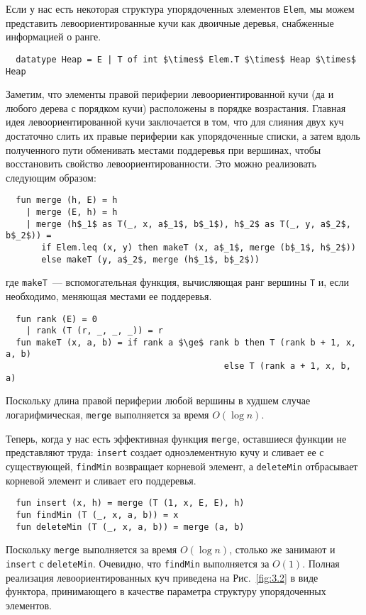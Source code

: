 Если у нас есть некоторая структура упорядоченных элементов
\lstinline!Elem!, мы можем представить левоориентированные кучи как
двоичные деревья, снабженные информацией о ранге.
\begin{lstlisting}
  datatype Heap = E | T of int $\times$ Elem.T $\times$ Heap $\times$ Heap
\end{lstlisting}
Заметим, что элементы правой периферии левоориентированной кучи (да и
любого дерева с порядком кучи) расположены в порядке возрастания.
Главная идея левоориентированной кучи заключается в том, что для
слияния двух куч достаточно слить их правые периферии как
упорядоченные списки, а затем вдоль полученного пути обменивать
местами поддеревья при вершинах, чтобы восстановить свойство
левоориентированности.  Это можно реализовать следующим образом:
\begin{lstlisting}
  fun merge (h, E) = h
    | merge (E, h) = h
    | merge (h$_1$ as T(_, x, a$_1$, b$_1$), h$_2$ as T(_, y, a$_2$, b$_2$)) =
       if Elem.leq (x, y) then makeT (x, a$_1$, merge (b$_1$, h$_2$))
       else makeT (y, a$_2$, merge (h$_1$, b$_2$))
\end{lstlisting}
где \lstinline!makeT!~--- вспомогательная функция, вычисляющая ранг
вершины \lstinline!T! и, если необходимо, меняющая местами ее
поддеревья.
\begin{lstlisting}
  fun rank (E) = 0
    | rank (T (r, _, _, _)) = r
  fun makeT (x, a, b) = if rank a $\ge$ rank b then T (rank b + 1, x, a, b)
                                           else T (rank a + 1, x, b, a)
\end{lstlisting}
Поскольку длина правой периферии любой вершины в худшем случае
логарифмическая, \lstinline!merge! выполняется за время $O(\log n)$.

Теперь, когда у нас есть эффективная функция \lstinline!merge!,
оставшиеся функции не представляют труда: \lstinline!insert! создает
одноэлементную кучу и сливает ее с существующей, \lstinline!findMin!
возвращает корневой элемент, а \lstinline!deleteMin! отбрасывает
корневой элемент и сливает его поддеревья.
\begin{lstlisting}
  fun insert (x, h) = merge (T (1, x, E, E), h)
  fun findMin (T (_, x, a, b)) = x
  fun deleteMin (T (_, x, a, b)) = merge (a, b)
\end{lstlisting}
Поскольку \lstinline!merge! выполняется за время $O(\log n)$, столько
же занимают и \lstinline!insert! с \lstinline!deleteMin!. Очевидно,
что \lstinline!findMin! выполняется за $O(1)$. Полная реализация
левоориентированных куч приведена на Рис.~\ref{fig:3.2} в виде
функтора, принимающего в качестве параметра структуру упорядоченных
элементов.

